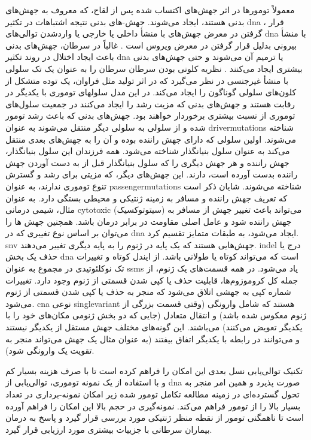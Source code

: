 معمولاً تومورها در اثر جهش‌های اکتساب شده پس از لقاح، که معروف به جهش‌های بدنی هستند، ایجاد می‌شوند. جهش-های بدنی نتیجه اشتباهات در تکثیر \gls{dna} \cite{behjati2014genome}، قرار گرفتن در معرض جهش‌های با منشأ داخلی یا خارجی یا وارد‌شدن توالی‌های \gls{dna} با منشأ بیرونی بدلیل قرار گرفتن در معرض ویروس است \cite{talbot2004viruses}. غالباً در سرطان، جهش‌های بدنی باعث ایجاد اختلال در روند تکثیر \gls{dna} یا ترمیم آن می‌شوند و حتی جهش‌های بدنی بیشتری ایجاد می‌کنند \cite{stratton2009cancer}. نظریه کلونی بودن سرطان \cite{nowell1976clonal} سرطان را به عنوان یک تک سلولی با منشأ غیرجنسی در نظر می‌گیرد که در اثر تولید مثل فراوان، یک توده متشکل از کلون‌های سلولی گوناگون را ایجاد می‌کند. در این مدل سلولهای توموری با یکدیگر در رقابت هستند و جهش‌های بدنی که مزیت رشد را ایجاد می‌کنند در جمعیت سلول‌های توموری از نسبت بیشتری برخوردار خواهند بود. جهش‌های بدنی که باعث رشد تومور شده و از سلولی به سلولی دیگر منتقل می‌شوند به عنوان \glspl{drivermutation} شناخته می‌شوند. اولین سلولی که دارای جهش راننده بوده و آن را به جهش‌های بعدی منتقل می‌کند به عنوان سلول بنیانگذار شناخته می‌شود. همه فرزندان این سلول بنیانگذار، جهش راننده و هر جهش دیگری را که سلول بنیانگذار قبل از به دست آوردن جهش راننده بدست آورده است، دارند. این جهش‌های دیگر، که مزیتی برای رشد و گسترش تنوع توموری ندارند، به عنوان \glspl{passengermutation} شناخته می‌شوند. شایان ذکر است که تعریف جهش راننده و مسافر به زمینه ژنتیکی و محیطی بستگی دارد. به عنوان مثال، شیمی درمانی \gls{cytotoxic}  (سیتوتوکسیک) می‌تواند باعث تغییر جهش از مسافر به جهش راننده شود و عامل اصلی مقاومت در برابر درمان باشد. همچنین جهش ها را می‌توان بر اساس نوع تغییری که در \gls{dna} ایجاد می‌شود، به طبقات متمایز تقسیم کرد. \gls{snv} جهش‌هایی هستند که یک پایه در ژنوم را به پایه دیگری تغییر می‌دهند. \gls{indel}  درج یا حذف یک بخش \gls{dna} است که می‌تواند کوتاه یا طولانی باشد. از ایندل کوتاه و تغییرات تک نوکلئوتیدی در مجموع به عنوان \glspl{ssm}  یاد می‌شود. در همه قسمت‌های یک ژنوم، از جمله کل کروموزوم‌ها، قابلیت حذف یا کپی شدن قسمتی از ژنوم وجود دارد. تغییرات شماره کپی  به جهشی اتلاق می‌شود که منجر به حذف یا کپی شدن قسمتی از ژنوم می‌شود. \gls{cna} نوعی \gls{singlevariant} هستند که شامل وارونگی (وقتی قسمت بزرگی از ژنوم معکوس شده باشد) و انتقال متعادل (جایی که دو بخش ژنومی مکان‌‌های خود را با یکدیگر تعویض می‌کنند) می‌باشند\cite{stratton2009cancer}. این گونه‌های مختلف جهش مستقل از یکدیگر نیستند و می‌توانند در رابطه با یکدیگر اتفاق بیفتند (به عنوان مثال یک جهش می‌تواند منجر به تقویت یک وارونگی شود). 



تکنیک توالی‌یابی نسل بعدی این امکان را فراهم کرده است تا با صرف هزینه بسیار کم و با استفاده از یک نمونه توموری، توالی‌یابی از \gls{dna} صورت پذیرد و همین امر منجر به تحول گسترده‌ای در زمینه مطالعه تکامل تومور شده زیر امکان نمونه-برداری در تعداد بسیار بالا را از تومور فراهم می‌کند. نمونه‌گیری در حجم بالا این امکان را فراهم آورده است تا ناهمگنی تومور از نقطه منظر ژنتیکی مورد بررسی قرار گیرد و پاسخ به درمان بیماران سرطانی با جزییات بیشتری مورد ارزیابی قرار گیرد.


